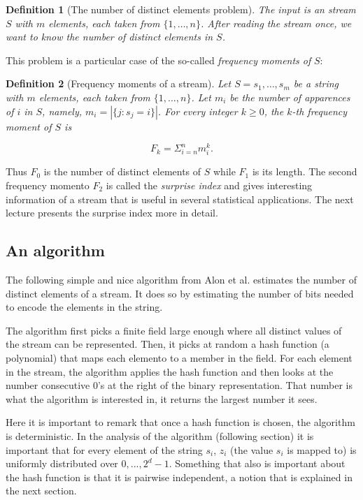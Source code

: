 \documentclass[12pt]{article}
\newtheorem{definition}{Definition}
\begin{document}
\begin{definition}[The number of distinct elements problem]
The input is an stream $S$ with $m$ elements, each taken from $\{1, \hdots, n\}$.
After reading the stream once, we want to know the number of distinct elements in $S$.
\end{definition}

This problem is a particular case of the so-called \emph{frequency moments of} $S$:


\begin{definition}[Frequency moments of a stream]
Let $S = s_1, \hdots, s_m$ be a string with $m$ elements, each taken from $\{1, \hdots, n\}$.
Let $m_i$ be the number of apparences of $i$ in $S$, namely, $m_i = | \{j : s_j = i\} |$.
For every integer $k \geq 0$, the \emph{$k$-th frequency moment of $S$} is

$$F_k = \Sigma^n_{i = n} m_i^k.$$ 
\end{definition}


Thus $F_0$ is the number of distinct elements of $S$ while $F_1$ is its length.
The second frequency momento $F_2$ is called the \emph{surprise index}
and gives interesting information of a stream that is useful in several statistical applications.
The next lecture presents the surprise index more in detail.

\subsection{An algorithm}

The following simple and nice algorithm from Alon et al. estimates the number of distinct elements of a stream.
It does so by estimating the number of bits needed to encode the elements in the string.

The algorithm first picks a finite field large enough where all distinct values of the stream can be
represented. Then, it picks at random a hash function (a polynomial) that maps each elemento to
a member in the field. 
For each element in the stream, the algorithm applies the hash function and then
looks at the number consecutive 0's at the right of the binary representation.
That number is what the algorithm is interested in, it returns the largest number it sees.

Here it is important to remark that once a hash function is chosen, the algorithm is deterministic. In the analysis of 
the algorithm (following section) it is important that for every element of the string $s_i$,
$z_i$ (the value $s_i$ is mapped to) is uniformly distributed over ${0, ..., 2^d-1}$.
Something that also is important about the hash function is that it is pairwise independent,
a notion that is explained in the next section.\\
\end{document}
